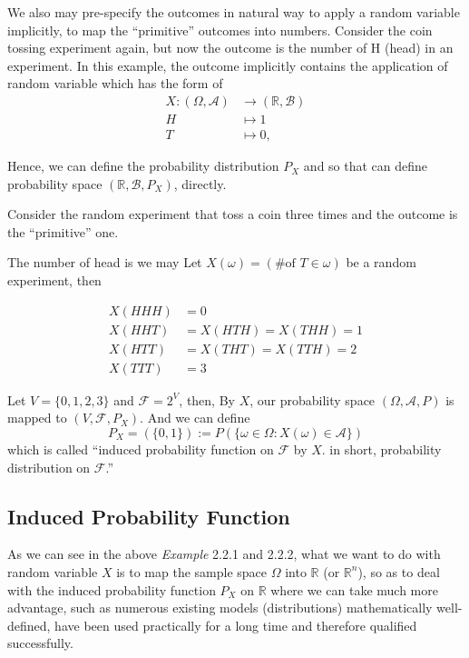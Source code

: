 \documentclass[twoside]{article}
\makeatletter
\theoremstyle{definition}
\theoremstyle{remark}
\theoremstyle{remark}
\newenvironment{example}
 {\patchcmd{\@thm}{\trivlist}{\list{}{\leftmargin=3em \rightmargin=3em}}{}{}%
  \vspace*{10\p@}
  \innerexample\pushQED{\hfill\ensuremath{\Diamond}}}
 {\popQED\endinnerexample}
\makeatother
\begin{document}
We also may pre-specify the outcomes in natural way to apply a random variable
implicitly, to map the ``primitive'' outcomes into numbers.
\begin{example} Consider the coin tossing experiment again, but now the outcome
  is the number of H (head) in an experiment. In this example, the outcome
  implicitly contains the application of random variable which has the form of
  \begin{equation*}
    \begin{split}
      X: (\Omega, \mathcal{A}) &\rightarrow (\mathbb{R}, \mathcal{B}) \\
      H &\mapsto 1 \\
      T &\mapsto 0,
    \end{split}
  \end{equation*}

  Hence, we can define the probability distribution $P_X$ and so that can define
  probability space $(\mathbb{R}, \mathcal{B}, P_X)$, directly.
\end{example}



\begin{example} Consider the random experiment that toss a coin three times and
  the outcome is the ``primitive'' one.

  The number of head is
  we may
  Let $X(\omega) = (\textrm{\# of } T \in \omega)$ be a random experiment, then

  \begin{equation*}
    \begin{split}
      X(HHH) &= 0 \\
      X(HHT) &= X(HTH) = X(THH) = 1 \\
      X(HTT) &= X(THT) = X(TTH) = 2 \\
      X(TTT) &= 3
    \end{split}
  \end{equation*}


  Let $V = \{ 0, 1, 2, 3 \}$ and $\mathcal{F} = 2^V$, then, By $X$, our probability
  space $(\Omega, \mathcal{A}, P)$ is mapped to $(V, \mathcal{F}, P_X)$. And we
  can define
  $$
  P_X = (\{ 0, 1 \}) := P(\{ \omega \in \Omega : X(\omega) \in \mathcal{A} \})
  $$
  which is called ``induced probability function on $\mathcal{F}$ by $X$.
  in short, probability distribution on $\mathcal{F}$.''
\end{example}

\subsection{Induced Probability Function}
As we can see in the above \textit{Example} 2.2.1 and 2.2.2, what we want to do
with random variable $X$ is to map the sample space $\Omega$ into $\mathbb{R}$
(or $\mathbb{R}^n$), so as to deal with the induced probability function $P_X$
on $\mathbb{R}$ where we can take much more advantage, such as numerous existing
models (distributions) mathematically well-defined, have been used practically
for a long time and therefore qualified successfully.
\end{document}
